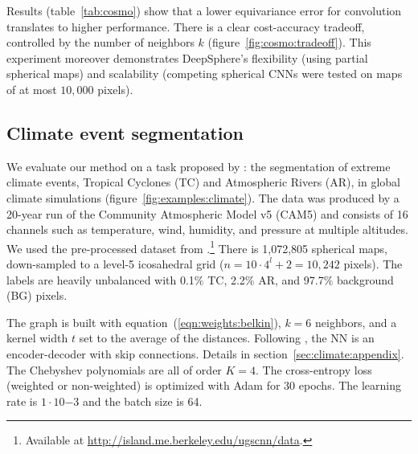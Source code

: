 \documentclass{article} %
\newcommand{\todo}[1]{{\color[rgb]{.6,.1,.6}{#1}}}
\newcommand{\figref}[1]{figure~\ref{fig:#1}}
\newcommand{\tabref}[1]{table~\ref{tab:#1}}
\newcommand{\secref}[1]{section~\ref{sec:#1}}
\newcommand{\eqnref}[1]{equation~(\ref{eqn:#1})}
\begin{document}
Results (\tabref{cosmo}) show that a lower equivariance error for convolution translates to higher performance.
There is a clear cost-accuracy tradeoff, controlled by the number of neighbors $k$ (\figref{cosmo:tradeoff}).
\todo{
	While extreme non-equivariance (the 2D CNN baseline) penalizes performance, better equivariance doesn't improve performance.
	It might be that the lack of built-in equivariance is compensated by learned equivariance (as done when augmenting data during training).}
\todo{
	Alternative: DSv2 better than v1 -> equivariance has practical implications.
}
This experiment moreover demonstrates DeepSphere's flexibility (using partial spherical maps) and scalability (competing spherical CNNs were tested on maps of at most $10,000$ pixels).

\subsection{Climate event segmentation} \label{sec:exp:climate}

We evaluate our method on a task proposed by \citep{mudigonda2017climateevents}: the segmentation of extreme climate events, Tropical Cyclones (TC) and Atmospheric Rivers (AR), in global climate simulations (\figref{examples:climate}).
The data was produced by a 20-year run of the Community Atmospheric Model v5 (CAM5) and consists of 16 channels such as temperature, wind, humidity, and pressure at multiple altitudes.
We used the pre-processed dataset from \citep{jiang2019sphericalcnn}.\footnote{Available at \url{http://island.me.berkeley.edu/ugscnn/data}.}
There is 1,072,805 spherical maps, down-sampled to a level-5 icosahedral grid ($n = 10 \cdot 4^l + 2 = 10,242$ pixels).
The labels are heavily unbalanced with 0.1\% TC, 2.2\% AR, and 97.7\% background (BG) pixels.

The graph is built with \eqnref{weights:belkin}, $k = 6$ neighbors, and a kernel width $t$ set to the average of the distances.
Following \citet{jiang2019sphericalcnn}, the NN is an encoder-decoder with skip connections.
Details in \secref{climate:appendix}.
The Chebyshev polynomials are all of order $K=4$.
The cross-entropy loss (weighted or non-weighted) is optimized with Adam for 30 epochs.
The learning rate is $1 \cdot 10{-3}$ and the batch size is 64.
\end{document}
